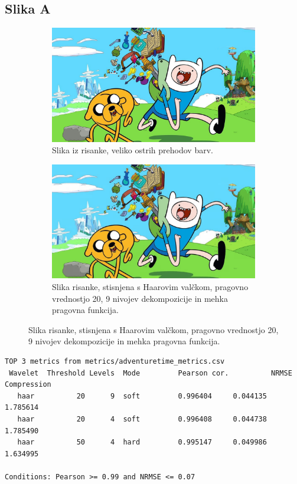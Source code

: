 \documentclass[a4paper,11pt]{article}
\begin{document}
\subsection{Slika A}

\begin{figure}
\centering
\begin{subfigure}[t]{0.8\textwidth}
\includegraphics[width=1\textwidth]{images/adventuretime.jpg}
\caption{Slika iz risanke, veliko ostrih prehodov barv.}
\label{slika1}
\end{subfigure}
\centering
\begin{subfigure}[t]{0.8\textwidth}
\includegraphics[width=1\textwidth]{images/report/adventuretime_comp.jpg}
\caption{Slika risanke, stisnjena s Haarovim valčkom, pragovno vrednostjo 20, 9 nivojev dekompozicije in mehka pragovna funkcija.}
\label{slika1:comp}
\end{subfigure}
\end{figure}


\begin{verbatim}
TOP 3 metrics from metrics/adventuretime_metrics.csv
 Wavelet  Threshold	Levels	Mode		 Pearson cor.	   	   NRMSE	    Compression
   haar	         20	     9	soft	     0.996404     0.044135	   	  1.785614
   haar	         20	     4	soft	     0.996408     0.044738	   	  1.785490
   haar	         50	     4	hard	     0.995147     0.049986	   	  1.634995

Conditions: Pearson >= 0.99	and	NRMSE <= 0.07
\end{verbatim}
\end{document}
